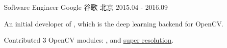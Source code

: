 \begin{cventries}
\cventry
{Software Engineer} %
{Google 谷歌} %
{北京} %
{2015.04 - 2016.09} %
{ %
\begin{cvitems}
\item {An initial developer of \href{https://github.com/tiny-dnn/tiny-dnn}{}, which is the deep learning backend for OpenCV}.
\item {Contributed 3 OpenCV modules: \href{https://www.youtube.com/watch?v=Mc20rTYdXTE}{}, \href{https://summerofcode.withgoogle.com/archive/2016/projects/4623962327744512}{} and \href{https://summerofcode.withgoogle.com/archive/2019/projects/6247164785721344}{\color{awesome-skyblue}\underline{super resolution}}.}
\end{cvitems}
}


\end{cventries}
